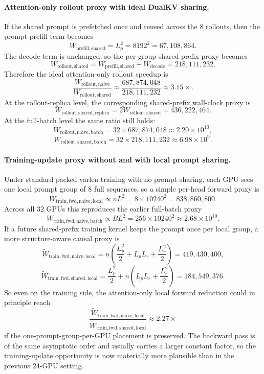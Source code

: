 \documentclass[11pt]{article}
\begin{document}
\paragraph{Attention-only rollout proxy with ideal DualKV sharing.}
If the shared prompt is prefetched once and reused across the $8$ rollouts,
then the prompt-prefill term becomes
\[
W_{\mathrm{prefill,shared}} = L_p^2 = 8192^2 = 67{,}108{,}864.
\]
The decode term is unchanged, so the per-group shared-prefix proxy becomes
\[
W_{\mathrm{rollout,shared}}
=
W_{\mathrm{prefill,shared}} + W_{\mathrm{decode}}
=
218{,}111{,}232.
\]
Therefore the ideal attention-only rollout speedup is
\[
\frac{W_{\mathrm{rollout,naive}}}{W_{\mathrm{rollout,shared}}}
\approx
\frac{687{,}874{,}048}{218{,}111{,}232}
\approx 3.15\times.
\]
At the rollout-replica level, the corresponding shared-prefix wall-clock proxy is
\[
W_{\mathrm{rollout,shared,replica}} = 2 W_{\mathrm{rollout,shared}} = 436{,}222{,}464.
\]
At the full-batch level the same ratio still holds:
\[
W_{\mathrm{rollout,naive,batch}} = 32 \times 687{,}874{,}048 \approx 2.20 \times 10^{10},
\]
\[
W_{\mathrm{rollout,shared,batch}} = 32 \times 218{,}111{,}232 \approx 6.98 \times 10^{9}.
\]

\paragraph{Training-update proxy without and with local prompt sharing.}
Under standard packed varlen training with no prompt sharing, each GPU sees one
local prompt group of $8$ full sequences, so a simple per-head forward proxy is
\[
W_{\mathrm{train,fwd,naive,local}} \propto nL^2
= 8 \times 10240^2
= 838{,}860{,}800.
\]
Across all $32$ GPUs this reproduces the earlier full-batch proxy
\[
W_{\mathrm{train,fwd,naive,batch}} \propto B L^2
= 256 \times 10240^2
\approx 2.68 \times 10^{10}.
\]
If a future shared-prefix training kernel keeps the prompt once per local group,
a more structure-aware causal proxy is
\[
\widetilde{W}_{\mathrm{train,fwd,naive,local}}
=
 n\left(\frac{L_p^2}{2} + L_p L_r + \frac{L_r^2}{2}\right)
=
419{,}430{,}400,
\]
\[
\widetilde{W}_{\mathrm{train,fwd,shared,local}}
=
\frac{L_p^2}{2} + n\left(L_p L_r + \frac{L_r^2}{2}\right)
=
184{,}549{,}376.
\]
So even on the training side, the attention-only local forward reduction could
in principle reach
\[
\frac{\widetilde{W}_{\mathrm{train,fwd,naive,local}}}{\widetilde{W}_{\mathrm{train,fwd,shared,local}}}
\approx 2.27\times
\]
if the one-prompt-group-per-GPU placement is preserved. The backward pass is of
the same asymptotic order and usually carries a larger constant factor, so the
training-update opportunity is now materially more plausible than in the
previous $24$-GPU setting.
\end{document}
